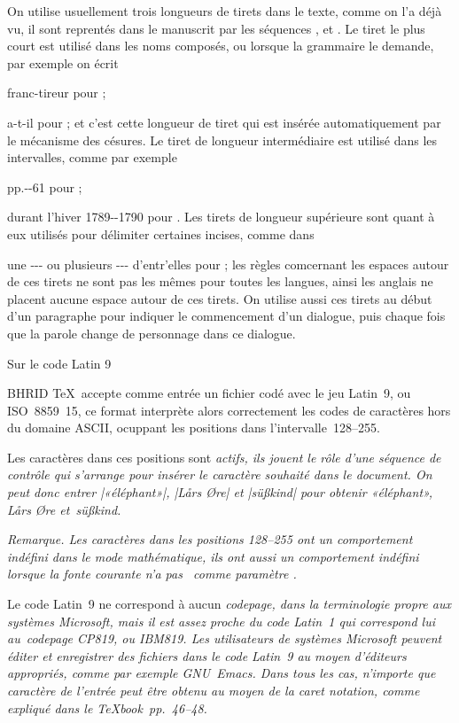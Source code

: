 On utilise usuellement trois longueurs de tirets dans le texte, comme
on l'a déjà vu, il sont reprentés dans le manuscrit par les séquences
\li{-}, \li{-{}-} et \li{-{-}-}. Le tiret le plus court est utilisé
dans les noms composés, ou lorsque la grammaire le demande, par
exemple on écrit
\beginlist\inset\literal
\item{franc-tireur} pour ;
\item{a-t-il} pour ;
\endlist
et c'est cette longueur de tiret qui est insérée automatiquement par
le mécanisme des césures. Le tiret de longueur intermédiaire est
utilisé dans les intervalles, comme par exemple
\beginlist\inset\literal
\item{pp.-{}-61}
 pour ;
\item{durant l'hiver 1789-{}-1790}
 pour .
\endlist
Les tirets de longueur supérieure sont quant à eux utilisés pour
délimiter certaines incises, comme dans
\beginlist\inset\literal
\item{une -{-}- ou plusieurs -{-}- d'entr'elles}
 pour ;
\endlist
les règles comcernant les espaces autour de ces tirets ne sont pas les
mêmes pour toutes les langues, ainsi les anglais ne placent aucune
espace autour de ces tirets. On utilise aussi ces tirets au début d'un
paragraphe pour indiquer le commencement d'un dialogue, puis chaque
fois que la parole change de personnage dans ce dialogue.


\formalpar Sur le code Latin 9

BHRID \TeX\ accepte comme entrée un fichier codé avec le jeu Latin~9,
ou ISO~8859~15, ce format interprète alors correctement les codes de
caractères hors du domaine ASCII, ocuppant les positions dans
l'intervalle~128--255.

Les caractères dans ces positions sont \em{actifs}, ils jouent le rôle
d'une séquence de contrôle qui s'arrange pour insérer le caractère
souhaité dans le document. On peut donc entrer |«éléphant»|,
|Lårs Øre| et |süßkind| pour obtenir \em{«éléphant»}, \em{Lårs Øre}
et~\em{süßkind}.

\em{Remarque. Les caractères dans les positions 128--255 ont un
comportement indéfini dans le mode mathématique, ils ont aussi
un comportement indéfini lorsque la fonte courante n'a pas~
comme paramètre .}

Le code Latin~9 ne correspond à aucun \em{codepage}, dans la
terminologie propre aux systèmes Microsoft, mais il est assez proche
du code Latin~1 qui correspond lui au~\em{codepage} CP819, ou
IBM819. Les utilisateurs de systèmes Microsoft peuvent éditer et
enregistrer des fichiers dans le code Latin~9 au moyen d'éditeurs
appropriés, comme par exemple GNU~Emacs. Dans tous les cas, n'importe
que caractère de l'entrée peut être obtenu au moyen de la \em{caret
notation}, comme expliqué dans le {\sl\TeX book}~pp.~46--48.

